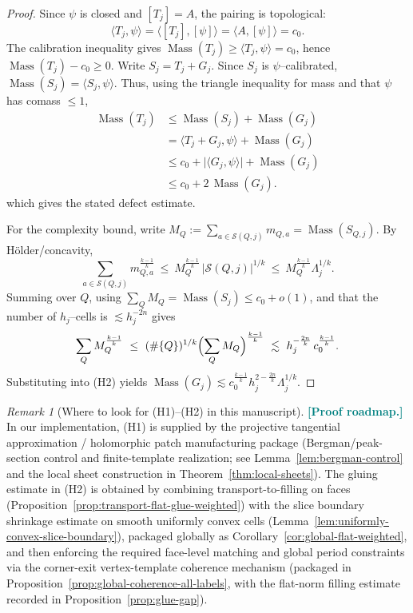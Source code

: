 \documentclass[11pt]{article}
\newcommand{\REVMZ}[1]{\textcolor{teal}{#1}}  %
\numberwithin{equation}{section}  %
\theoremstyle{plain}
\theoremstyle{definition}
\theoremstyle{remark}
\newtheorem{remark}[theorem]{Remark}
\DeclareMathOperator{\Mass}{Mass}
\begin{document}
\begin{proof}
Since $\psi$ is closed and $[T_j]=A$, the pairing is topological:
\[
\langle T_j,\psi\rangle=\langle [T_j],[\psi]\rangle=\langle A,[\psi]\rangle=c_0.
\]
The calibration inequality gives $\Mass(T_j)\ge \langle T_j,\psi\rangle=c_0$, hence $\Mass(T_j)-c_0\ge 0$.
Write $S_j=T_j+G_j$.  Since $S_j$ is $\psi$--calibrated, $\Mass(S_j)=\langle S_j,\psi\rangle$.
Thus, using the triangle inequality for mass and that $\psi$ has comass $\le 1$,
\[
\begin{aligned}
\Mass(T_j)
&\le \Mass(S_j)+\Mass(G_j) \\
&= \langle T_j+G_j,\psi\rangle+\Mass(G_j) \\
&\le c_0+\bigl|\langle G_j,\psi\rangle\bigr|+\Mass(G_j) \\
&\le c_0+2\,\Mass(G_j).
\end{aligned}
\]
which gives the stated defect estimate.

For the complexity bound, write $M_Q:=\sum_{a\in\mathcal S(Q,j)} m_{Q,a}=\Mass(S_{Q,j})$.
By H\"older/concavity,
\[
\sum_{a\in\mathcal S(Q,j)} m_{Q,a}^{\frac{k-1}{k}}
\ \le\ M_Q^{\frac{k-1}{k}}\,|\mathcal S(Q,j)|^{1/k}
\ \le\ M_Q^{\frac{k-1}{k}}\Lambda_j^{1/k}.
\]
Summing over $Q$, using $\sum_Q M_Q=\Mass(S_j)\le c_0+o(1)$, and that the number of $h_j$--cells is $\lesssim h_j^{-2n}$ gives
\[
\sum_Q M_Q^{\frac{k-1}{k}}
\ \le\ (\#\{Q\})^{1/k}\Bigl(\sum_Q M_Q\Bigr)^{\frac{k-1}{k}}
\ \lesssim\ h_j^{-\frac{2n}{k}}\,c_0^{\frac{k-1}{k}}.
\]
Substituting into (H2) yields $\Mass(G_j)\lesssim c_0^{\frac{k-1}{k}}h_j^{2-\frac{2n}{k}}\Lambda_j^{1/k}$.
\end{proof}


\begin{remark}[Where to look for (H1)--(H2) in this manuscript]
\REVMZ{\textbf{[Proof roadmap.]}}
In our implementation, (H1) is supplied by the projective tangential approximation / holomorphic patch manufacturing package
(Bergman/peak-section control and finite-template realization; see Lemma~\ref{lem:bergman-control} and the local sheet construction in Theorem~\ref{thm:local-sheets}).
The gluing estimate in (H2) is obtained by combining transport-to-filling on faces (Proposition~\ref{prop:transport-flat-glue-weighted}) with the slice boundary shrinkage
estimate on smooth uniformly convex cells (Lemma~\ref{lem:uniformly-convex-slice-boundary}), packaged globally as Corollary~\ref{cor:global-flat-weighted},
and then enforcing the required face-level matching and global period constraints via the corner-exit vertex-template coherence mechanism
(packaged in Proposition~\ref{prop:global-coherence-all-labels}, with the flat-norm filling estimate recorded in Proposition~\ref{prop:glue-gap}).
\end{remark}
\end{document}
